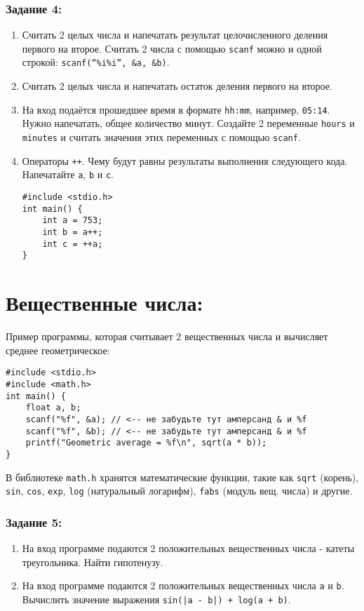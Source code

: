 \documentclass{article}
\begin{document}
\subsubsection*{Задание 4:}
\begin{enumerate}
\item Считать 2 целых числа и напечатать результат целочисленного деления первого на второе. Считать 2 числа с помощью \texttt{scanf} можно и одной строкой: \texttt{scanf(``\%i\%i'', \&a, \&b)}.
\item Считать 2 целых числа и напечатать остаток деления первого на второе.
\item На вход подаётся прошедшее время в формате \texttt{hh:mm}, например, \texttt{05:14}. Нужно напечатать, общее количество минут. Создайте 2 переменные \texttt{hours} и \texttt{minutes} и считать значения этих переменных с помощью \texttt{scanf}. 
\item Операторы \texttt{++}. Чему будут равны результаты выполнения следующего кода. Напечатайте \texttt{a}, \texttt{b} и \texttt{c}.
\begin{lstlisting}
#include <stdio.h>
int main() {
    int a = 753;
    int b = a++;
    int c = ++a;
}
\end{lstlisting}
\end{enumerate}


\newpage
\section*{Вещественные числа:}
Пример программы, которая считывает 2 вещественных числа и вычисляет среднее геометрическое:
\begin{lstlisting}
#include <stdio.h>
#include <math.h>
int main() {
    float a, b;
    scanf("%f", &a); // <-- не забудьте тут амперсанд & и %f
    scanf("%f", &b); // <-- не забудьте тут амперсанд & и %f
    printf("Geometric average = %f\n", sqrt(a * b));
}
\end{lstlisting}
В библиотеке \texttt{math.h} хранятся математические функции, такие как \texttt{sqrt} (корень), \texttt{sin}, \texttt{cos}, \texttt{exp}, \texttt{log} (натуральный логарифм), \texttt{fabs} (модуль вещ. числа) и другие. 
\subsubsection*{Задание 5:}
\begin{enumerate}
\item На вход программе подаются 2 положительных вещественных числа - катеты треугольника. Найти гипотенузу.
\item На вход программе подаются 2 положительных вещественных числа \texttt{a} и \texttt{b}. Вычислить значение выражения \texttt{sin(|a - b|) + log(a + b)}.
\end{enumerate}
\end{document}

